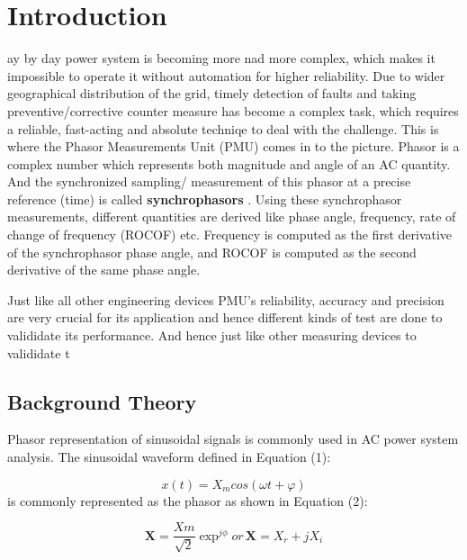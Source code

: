 \section{Introduction}
ay by day power system is becoming more nad more complex, which makes it impossible to operate it without automation for higher reliability. Due to wider geographical distribution of the grid, timely detection of faults and taking preventive/corrective counter measure  has become a complex task, which requires a reliable, fast-acting and absolute techniqe to deal with the challenge. This is where the Phasor Measurements Unit (PMU) comes in to the picture. Phasor is a complex number which represents both magnitude and angle of an AC quantity. And the synchronized sampling/ measurement of this phasor at a precise reference (time) is called \textbf{synchrophasors} \cite{std:c37}. Using these synchrophasor measurements, different quantities are derived like phase angle, frequency, rate of change of frequency (ROCOF) etc. Frequency is computed as the first derivative of the synchrophasor phase angle, and ROCOF is computed as the second derivative of the same phase angle. 

Just like all other engineering devices PMU's reliability, accuracy  and precision are very crucial for its application and hence different kinds of test are done to valididate its performance. And hence just like other measuring devices to valididate t 

\subsection{Background Theory}
Phasor representation of sinusoidal signals is commonly used in AC power system analysis. The sinusoidal waveform defined in Equation (1):

\begin{equation}
x(t) = X_m cos(\omega t + \varphi)
\end{equation}
is commonly represented as the phasor as shown in Equation (2):

\begin{equation}
\textbf{X} = \frac{Xm}{\sqrt{2}}\exp^{j\phi}
or\hspace{2pt} \textbf{X} = X_r+jX_i
\end{equation}

